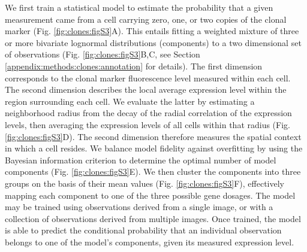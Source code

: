 We first train a statistical model to estimate the probability that a given measurement came from a cell carrying zero, one, or two copies of the clonal marker (Fig. \ref{fig:clones:figS3}A). This entails fitting a weighted mixture of three or more bivariate lognormal distributions (components) to a two dimensional set of observations (Fig. \ref{fig:clones:figS3}B,C, see Section \ref{appendix:methods:clones:annotation} for details). The first dimension corresponds to the clonal marker fluorescence level measured within each cell. The second dimension describes the local average expression level within the region surrounding each cell. We evaluate the latter by estimating a neighborhood radius from the decay of the radial correlation of the expression levels, then averaging the expression levels of all cells within that radius (Fig. \ref{fig:clones:figS3}D). The second dimension therefore measures the spatial context in which a cell resides. We balance model fidelity against overfitting by using the Bayesian information criterion to determine the optimal number of model components (Fig. \ref{fig:clones:figS3}E). We then cluster the components into three groups on the basis of their mean values (Fig. \ref{fig:clones:figS3}F), effectively mapping each component to one of the three possible gene dosages. The model may be trained using observations derived from a single image, or with a collection of observations derived from multiple images. Once trained, the model is able to predict the conditional probability that an individual observation belongs to one of the model's components, given its measured expression level.


